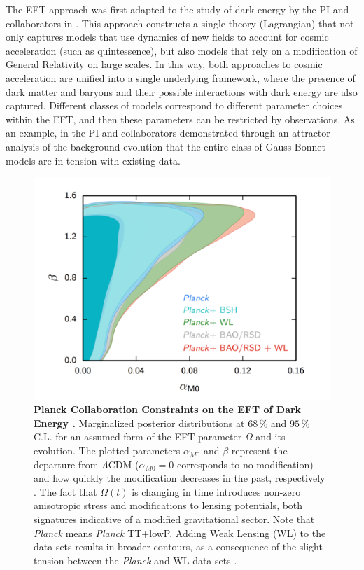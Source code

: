 \documentclass[useAMS,12pt]{article}
\begin{document}
The EFT approach was first adapted to the study of dark energy by the PI and collaborators in \cite{Park:2010cw}.  This approach constructs a single theory (Lagrangian) that not only captures models that use dynamics of new fields to account for cosmic acceleration (such as quintessence), but also models that rely on a modification of General Relativity on large scales.
In this way, both approaches to cosmic acceleration are unified into a single underlying framework, where
the presence of dark matter and baryons and their possible interactions with dark energy are also captured.  Different classes of models correspond to different parameter choices within the EFT, and then these parameters can be restricted by observations. As an example, in \cite{Mueller:2012kb} the PI and collaborators demonstrated through an attractor analysis of the background evolution that the entire class of Gauss-Bonnet models are in tension with existing data.   
\begin{figure}[t]
\begin{center} 
\includegraphics*[width=5.0in]{fig1.pdf}
\end{center}
\caption{{\bf Planck Collaboration Constraints on the EFT of Dark Energy \cite{Ade:2015rim}. } Marginalized posterior distributions at $68\,\%$ and $95\,\%$ C.L.
for an assumed form of the EFT parameter $\Omega$ and its evolution. The plotted parameters $\alpha_{M0}$ and $\beta$ represent the departure from $\Lambda$CDM ($\alpha_{M0}=0$ corresponds to no modification) and how quickly the modification decreases in the past, respectively \cite{Ade:2015rim}.  
The fact that $\Omega(t)$ is changing in time introduces non-zero anisotropic stress and modifications to lensing potentials, both signatures indicative of a modified gravitational sector.
Note that {\em Planck} means {\em Planck} TT+lowP. Adding Weak Lensing (WL) to the data sets results
in broader contours, as a
consequence of the slight tension between the {\em Planck} and WL data sets \cite{Ade:2015rim}. \label{fig1}} 
\end{figure}
\\
\end{document}
